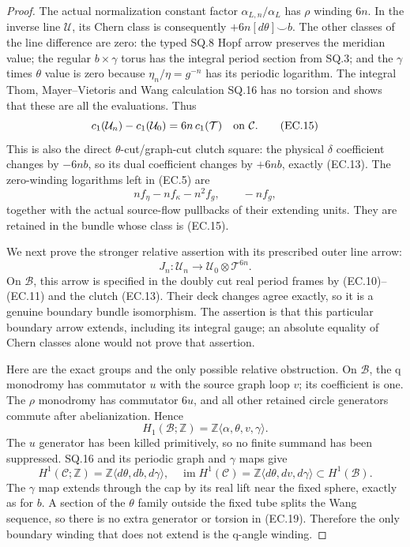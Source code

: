 \begin{proof}
The actual normalization constant factor
\(\alpha_{L,n}/\alpha_L\) has \(\rho\) winding \(6n\). In the inverse
line \(\mathcal U\), its Chern class is consequently
\(+6n[d\theta]\smile b\). The other classes of the line difference
are zero: the typed SQ.8 Hopf arrow preserves the meridian value;
the regular \(b\times\gamma\) torus has the integral period section
from SQ.3; and the \(\gamma\) times \(\theta\) value is zero because
\(\eta_n/\eta=g^{-n}\) has its periodic logarithm. The integral
Thom, Mayer--Vietoris and Wang calculation SQ.16 has no torsion
and shows that these are all the evaluations. Thus
\[
 c_1(\mathcal U_n)-c_1(\mathcal U_0)
                   =6n\,c_1(\mathcal T)
             \quad\hbox{on }\mathcal C.               \tag{EC.15}
\]
This is also the direct \(\theta\)-cut/graph-cut clutch square: the
physical \(\delta\) coefficient changes by \(-6n b\), so its dual
coefficient changes by \(+6n b\), exactly (EC.13).
The zero-winding logarithms left in (EC.5) are
\[
 nf_\eta-nf_\kappa-n^2f_g,\qquad -nf_g,
                                                        \tag{EC.16}
\]
together with the actual source-flow pullbacks of their extending
units. They are retained in the bundle whose class is (EC.15).

We next prove the stronger relative assertion with its prescribed
outer line arrow:
\[
 J_n:\mathcal U_n\longrightarrow
                    \mathcal U_0\otimes\mathcal T^{6n}.
                                                        \tag{EC.17}
\]
On \(\mathcal B\), this arrow is specified in the doubly cut real
period frames by (EC.10)--(EC.11) and the clutch (EC.13).
Their deck changes agree exactly, so it is a genuine boundary
bundle isomorphism. The assertion is that this particular boundary
arrow extends, including its integral gauge; an absolute equality
of Chern classes alone would not prove that assertion.

Here are the exact groups and the only possible relative obstruction.
On \(\mathcal B\), the q monodromy has commutator \(u\) with the
source graph loop \(v\); its coefficient is one. The \(\rho\) monodromy
has commutator \(6u\), and all other retained circle generators
commute after abelianization. Hence
\[
 H_1(\mathcal B;\mathbb Z)
       =\mathbb Z\langle\alpha,\theta,v,\gamma\rangle.
                                                        \tag{EC.18}
\]
The \(u\) generator has been killed primitively, so no finite
summand has been suppressed. SQ.16 and its periodic graph and
\(\gamma\) maps give
\[
 H^1(\mathcal C;\mathbb Z)
       =\mathbb Z\langle d\theta,db,d\gamma\rangle,
\quad
 \operatorname{im}H^1(\mathcal C)
       =\mathbb Z\langle d\theta,dv,d\gamma\rangle
                   \subset H^1(\mathcal B).           \tag{EC.19}
\]
The \(\gamma\) map extends through the cap by its real lift near the
fixed sphere, exactly as for \(b\). A section of the \(\theta\)
family outside the fixed tube splits the Wang sequence, so there
is no extra generator or torsion in (EC.19). Therefore the only
boundary winding that does not extend is the q-angle winding.


\end{proof}

